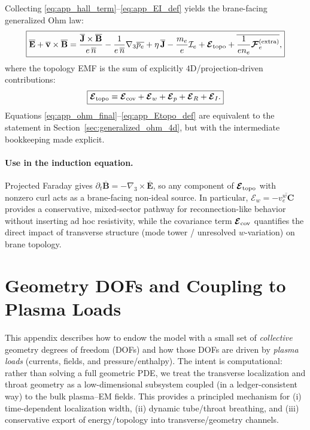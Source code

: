 \documentclass[11pt]{article}
\begin{document}
Collecting \eqref{eq:app_hall_term}--\eqref{eq:app_EI_def} yields the brane-facing generalized Ohm law:
\begin{equation}
\boxed{
\overline{\mathbf{E}}+\overline{\mathbf{v}}\times\overline{\mathbf{B}}
=
\frac{\overline{\mathbf{J}}\times\overline{\mathbf{B}}}{e\,\overline{n}}
-\frac{1}{e\,\overline{n}}\nabla_3\overline{p_e}
+\eta\,\overline{\mathbf{J}}
-\frac{m_e}{e}\mathcal{I}_e
+\boldsymbol{\mathcal{E}}_{\rm topo}
+\overline{\frac{1}{e n_e}\boldsymbol{\mathcal{F}}^{(\mathrm{extra})}_e},
}
\label{eq:app_ohm_final}
\end{equation}
where the topology EMF is the sum of explicitly \(4\)D/projection-driven contributions:
\begin{equation}
\boxed{
\boldsymbol{\mathcal{E}}_{\rm topo}
\equiv
\boldsymbol{\mathcal{E}}_{\rm cov}
+\boldsymbol{\mathcal{E}}_{w}
+\boldsymbol{\mathcal{E}}_{p}
+\boldsymbol{\mathcal{E}}_{R}
+\boldsymbol{\mathcal{E}}_{I}.
}
\label{eq:app_Etopo_def}
\end{equation}
Equations \eqref{eq:app_ohm_final}--\eqref{eq:app_Etopo_def} are equivalent to the statement in
Section~\ref{sec:generalized_ohm_4d}, but with the intermediate bookkeeping made explicit.

\paragraph{Use in the induction equation.}
Projected Faraday gives \(\partial_t\overline{\mathbf{B}}=-\nabla_3\times\overline{\mathbf{E}}\), so any component of
\(\boldsymbol{\mathcal{E}}_{\rm topo}\) with nonzero curl acts as a brane-facing non-ideal source. In particular,
\(\boldsymbol{\mathcal{E}}_{w}=-\overline{v_e^w\mathbf{C}}\) provides a conservative, mixed-sector pathway for
reconnection-like behavior without inserting ad hoc resistivity, while the covariance term \(\boldsymbol{\mathcal{E}}_{\rm cov}\)
quantifies the direct impact of transverse structure (mode tower / unresolved \(w\)-variation) on brane topology.

\section{Geometry DOFs and Coupling to Plasma Loads}
\label{app:geometry_dofs_plasma}

This appendix describes how to endow the model with a small set of \emph{collective}
geometry degrees of freedom (DOFs) and how those DOFs are driven by \emph{plasma loads}
(currents, fields, and pressure/enthalpy). The intent is computational: rather than
solving a full geometric PDE, we treat the transverse localization and throat geometry
as a low-dimensional subsystem coupled (in a ledger-consistent way) to the bulk plasma--EM
fields. This provides a principled mechanism for (i) time-dependent localization width,
(ii) dynamic tube/throat breathing, and (iii) conservative export of energy/topology into
transverse/geometry channels.
\end{document}
